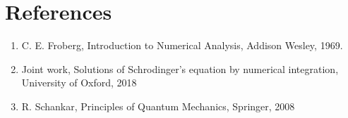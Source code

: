 \documentclass{llncs}
\begin{document}
\section{References}

\begin{enumerate}
	\item C. E. Froberg, Introduction to Numerical Analysis, Addison Wesley, 1969.
	\item Joint work, Solutions of Schrodinger's equation by numerical integration, University of Oxford, 2018
	\item R. Schankar, Principles of Quantum Mechanics, Springer, 2008
\end{enumerate}
\end{document}

